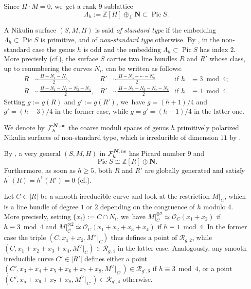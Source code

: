 \documentclass[11pt]{article}
\newcommand{\cf}{cf.\xspace}
\newcommand{\ns}{{\mkern1mu\mathrm{ns}}}
\newcommand{\bN}{\boldsymbol{N}}
\theoremstyle{plain}
\theoremstyle{definition}
\DeclareMathOperator{\Pic}{Pic}
\newcommand\ZZ{{\mathbb Z}}
\newcommand\F{{\mathcal F}}
\newcommand\R{{\mathcal R}}
\let\+\oplus
\begin{document}
Since $H\cdot M=0$, we~get a rank $9$ sublattice
\[
 \Lambda_h:= \ZZ[H] \+_{\perp} \bN \subset \Pic S.
\]

A Nikulin surface $(S,M,H)$ is said {\it of standard type} if the embedding $\Lambda_h \subset \Pic S$ is primitive, and of {\it non-standard type} otherwise. By \cite[Prop.\,2.2]{vGS}, in the non-standard case the genus $h$ is odd and the embedding $\Lambda_h \subset \Pic S$ has index $2$. More precisely (\cf \cite[Prop.\,2.1 \& Cor.\,2.1]{GS}), the surface $S$ carries two line bundles $R$ and $R'$ whose class, up to renumbering the curves $N_i$, can be written as follows:
\begin{align*}
R&\sim \frac{H-N_1-N_2}{2},&R'&\sim\frac{H-N_3-\cdots-N_8 }{2}&\text{if } h &\equiv 3 \bmod 4;
\\
R&\sim \frac{H-N_1-N_2-N_3-N_4}{2},&R'&\sim \frac{H-N_5-N_6-N_7-N_8}{2}&\text{if } h &\equiv 1 \bmod 4.
\end{align*}
Setting $g:=g(R)$ and $g':=g(R')$, we~have $g=(h+1)/4$ and $g'=(h-3)/4$ in the former case, while $g=g'=(h-1)/4$ in the latter one.

We denote by $\F_h^{\bN,\ns}$ the coarse moduli spaces of genus $h$ primitively polarized Nikulin surfaces of non-standard type, which is irreducible of dimension $11$ by \hbox{\cite[\S 3]{Do}}.

By \cite[Prop.\,2.1 \& Cor.\,2.1]{GS}, a very general $(S,M,H)$ in $\F_h^{\bN,\ns}$ has Picard number $9$ and
\begin{equation}
\label{eq:pic9}
\Pic S \cong \ZZ[R] \+ \bN.
\end{equation}
Furthermore, as soon as $h\geq 5$, both $R$ and $R'$ are globally generated and satisfy $h^1(R)=h^1(R')=0$ (\cf \cite[Prop.\,2.3(i)]{KLV2}).

Let $C\in |R|$ be a smooth irreducible curve and look at the restriction $M|_C$, which is a line bundle of degree $1$ or $2$ depending on the congruence of $h$ modulo $4$. More precisely, setting $\{x_i\}:=C\cap N_i$, we~have $M|_C^{\otimes 2}\simeq \mathcal O_C(x_1+x_2)$ if $h \equiv 3 \bmod 4$ and $M|_C^{\otimes 2}\simeq \mathcal O_C(x_1+x_2+x_3+x_4)$ if $h \equiv 1 \bmod 4$. In the former case the triple $(C,x_1+x_2,M^\vee|_C)$ thus defines a point of $\mathcal R_{g,2}$, while $(C,x_1+x_2+x_3+x_4,M^\vee|_C)\in\mathcal R_{g,4}$ in the latter case. Analogously, any smooth irreducible curve $C'\in |R'|$ defines either a point $(C', x_3+x_4+x_5+x_6+x_7+x_8,M^\vee|_{C'})\in \mathcal R_{g',6}$ if $h \equiv 3 \bmod 4$, or a point $(C',x_5+x_6+x_7+x_8,M^\vee|_{C'})\in\R_{g',4}$ otherwise.
\end{document}
